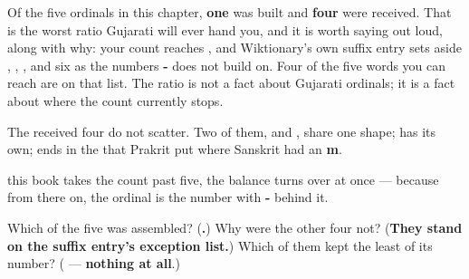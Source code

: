\begin{grammarlens}[title={What you've built this chapter, in one number}]
Of the five ordinals in this chapter, \textbf{one} was built and \textbf{four} were received. That is the worst ratio Gujarati will ever hand you, and it is worth saying out loud, along with why: your count reaches \textbf{}, and Wiktionary's own suffix entry sets aside \textbf{}, \textbf{}, \textbf{}, \textbf{} and six as the numbers \textbf{-} does not build on. Four of the five words you can reach are on that list. The ratio is not a fact about Gujarati ordinals; it is a fact about where the count currently stops.

The received four do not scatter. Two of them, \textbf{} and \textbf{}, share one shape; \textbf{} has its own; \textbf{} ends in the \textbf{} that Prakrit put where Sanskrit had an \textbf{m}.

\textbf{} this book takes the count past five, the balance turns over at once — because from there on, the ordinal is the number with \textbf{-} behind it.
\end{grammarlens}

\begin{tcolorbox}[breakable,colback=teal!4,colframe=teal!35!black,title={Before you move on}]
Which of the five was assembled? (\textbf{.}) Why were the other four not? (\textbf{They stand on the suffix entry's exception list.}) Which of them kept the least of its number? (\textbf{} — \textbf{nothing at all}.)
\end{tcolorbox}
